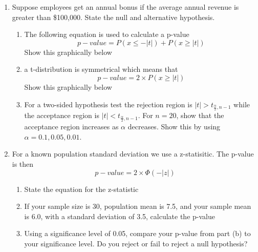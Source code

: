 \documentclass{article}
\begin{document}
\begin{enumerate}
\item Suppose employees get an annual bonus if the average annual revenue is greater than \$100,000. State the null and alternative hypothesis.
\begin{enumerate}
\item The following equation is used to calculate a p-value
\begin{equation*}
p-value = P(x \le -|t|) + P(x \ge |t|)
\end{equation*}
Show this graphically below \\
\item a t-distribution is symmetrical which means that 
\begin{equation*}
p-value = 2 \times P(x \ge |t|)
\end{equation*}
Show this graphically below \\ 
\item For a two-sided hypothesis test the rejection region is $|t| > t_{\frac{\alpha}{2},n-1}$ while the acceptance region is $|t| < t_{\frac{\alpha}{2},n-1}$. For $n=20$, show that the acceptance region increases as $\alpha$ decreases. Show this by using $\alpha = 0.1, 0.05, 0.01$.
\end{enumerate}
\item For a known population standard deviation we use a z-statisitic. The p-value is then 
\begin{equation*}
p-value = 2\times \Phi (-|z|)
\end{equation*}
\begin{enumerate}
\item State the equation for the z-statistic
\item If your sample size is 30, population mean is 7.5, and your sample mean is 6.0, with a standard deviation of 3.5, calculate the p-value
\item Using a significance level of 0.05, compare your p-value from part (b) to your significance level. Do you reject or fail to reject a null hypothesis?
\end{enumerate}
\end{enumerate}
\newpage
\end{document}
